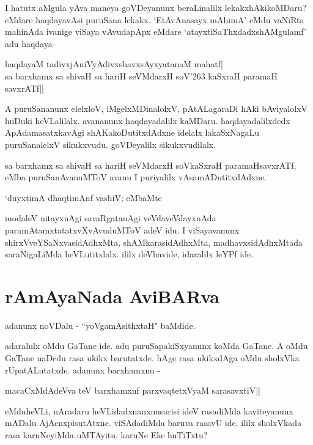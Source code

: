 I hatutx aMgula yAva maneya goVDeyanunx beraLinalilx lekakxhAkikoMDaru? eMdare haqdayavAsi puruSana lekakx. `EtAvAnasayx mAhimA'\label{249f} eMdu vaNiRta mahinAda ivanige viSaya vAvudapApx eMdare `atayxtiSaThxdadxshAMgulamf' adu haqdaya-

\begin{shloka}
haqdayaM tadivxjAniVyAdivxshavxsAyxyatanaM mahatf|\label{249e}\\
sa barxhamx sa shivaH sa hariH seVMdarxH soV\char'263 kaSxraH paramaH savxrATf||\label{249c}
\end{shloka}

A puruSananunx elelxloV, iMgelxMDinalolxV, pAtALagaraDi hAki bAviyalolxV huDuki heVLalilalx. avananunx haqdayadalilx kaMDaru. haqdayadalilxdedx ApAdamasatxkavAgi shAKakoDutitxdAdxne idelalx lakaSxNagaLu puruSanalelxV sikukxvudu. goVDeyalilx sikukxvudilalx. 

sa barxhamx sa shivaH sa hariH seVMdarxH soVkaSxraH paramaHsavxrATf, eMba puruSanAvanuMToV avanu I puriyalilx vAsamADutitxdAdxne.

\begin{shloka}
`duyxtimA dhaqtimAnf vashiV; eMbaMte \label{249}
\end{shloka}

modaleV nitayxnAgi savaRgatanAgi veVdaveVdayxnAda paramAtamxtatatxvXvAvuduMToV adeV idu. I viSayavanunx shirxVveYSaNxvasidAdhxMta, shAMkarasidAdhxMta, madhavxsidAdhxMtada saraNigaLiMda heVLutitxlalx. ililx deVhavide, idaralilx leYPf ide. 

\section*{rAmAyaNada AviBARva}

\begin{shloka}
adanunx noVDalu - ``yoVgamAsithxtaH"\label{249b} baMdide.
\end{shloka}

adaralulx oMdu GaTane ide. adu puruSapakiSxyanunx koMda GaTane. A oMdu GaTane naDedu rasa ukikx barutatxde. hAge rasa ukikxdAga oMdu sholxVka rUpatALutatxde. adanunx barxhamxnu -

\begin{shloka}
macaCxMdAdeVva teV barxhamxnf  parxvaqtetxVyaM sarasavxtiV||\label{250c}
\end{shloka}

eMduheVLi, nAradaru heVLidadxnanxnusarisi ideV rasadiMda kaviteyanunx mADalu AjAcnxpisutAtxne. viSAdadiMda baruva rasavU ide. ililx sholxVkada rasa karuNeyiMda uMTAyitu. karuNe Eke huTiTxtu? 

